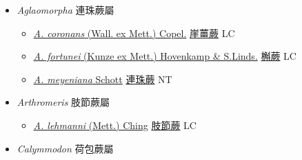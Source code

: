 
  \begin{itemize}
 \item[] \textit{Aglaomorpha} 連珠蕨屬
                    
  \begin{itemize}
        \item[] \href{http://www.theplantlist.org/tpl1.1/search?q=Aglaomorpha+coronans}{\textit{A. coronans} (Wall. ex Mett.) Copel.}     \href{\detokenize{http://taibnet.sinica.edu.tw/chi/taibnet_species_list.php?T2=崖薑蕨&T2_new_value=true&fr=y}}{崖薑蕨} LC
        \item[] \href{http://www.theplantlist.org/tpl1.1/search?q=Aglaomorpha+fortunei}{\textit{A. fortunei} (Kunze ex Mett.) Hovenkamp \& S.Linds.}     \href{\detokenize{http://taibnet.sinica.edu.tw/chi/taibnet_species_list.php?T2=槲蕨&T2_new_value=true&fr=y}}{槲蕨} LC
        \item[] \href{http://www.theplantlist.org/tpl1.1/search?q=Aglaomorpha+meyeniana}{\textit{A. meyeniana} Schott}   \href{\detokenize{http://taibnet.sinica.edu.tw/chi/taibnet_species_list.php?T2=連珠蕨&T2_new_value=true&fr=y}}{連珠蕨} NT
  \end{itemize}
 \item[] \textit{Arthromeris} 肢節蕨屬
                    
  \begin{itemize}
        \item[] \href{http://www.theplantlist.org/tpl1.1/search?q=Arthromeris+lehmanni}{\textit{A. lehmanni} (Mett.) Ching}   \href{\detokenize{http://taibnet.sinica.edu.tw/chi/taibnet_species_list.php?T2=肢節蕨&T2_new_value=true&fr=y}}{肢節蕨} LC
  \end{itemize}
 \item[] \textit{Calymmodon} 荷包蕨屬
                    

\end{itemize}
